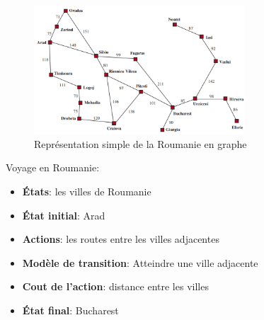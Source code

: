 \documentclass[a4paper, 12pt]{extarticle}
\begin{document}
\begin{figure}[H]
    \begin{center}
        \includegraphics[width=0.70\textwidth]{./pictures/roumanie.png}
    \end{center}
    \caption{Représentation simple de la Roumanie en graphe}\label{fig:romania}
\end{figure}



\begin{example}\leavevmode
    Voyage en Roumanie:
    \begin{itemize}
        \item \textbf{États}: les villes de Roumanie
        \item \textbf{État initial}: Arad
        \item \textbf{Actions}: les routes entre les villes adjacentes
        \item \textbf{Modèle de transition}: Atteindre une ville adjacente
        \item \textbf{Cout de l'action}: distance entre les villes
        \item \textbf{État final}: Bucharest 
    \end{itemize}
\end{example}
















\end{document}
